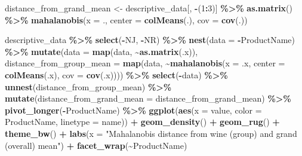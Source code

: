 \documentclass[
]{book}
\newenvironment{Shaded}{\begin{snugshade}}{\end{snugshade}}
\newcommand{\AttributeTok}[1]{\textcolor[rgb]{0.13,0.29,0.53}{#1}}
\newcommand{\DecValTok}[1]{\textcolor[rgb]{0.00,0.00,0.81}{#1}}
\newcommand{\FunctionTok}[1]{\textcolor[rgb]{0.13,0.29,0.53}{\textbf{#1}}}
\newcommand{\NormalTok}[1]{#1}
\newcommand{\OtherTok}[1]{\textcolor[rgb]{0.56,0.35,0.01}{#1}}
\newcommand{\SpecialCharTok}[1]{\textcolor[rgb]{0.81,0.36,0.00}{\textbf{#1}}}
\newcommand{\StringTok}[1]{\textcolor[rgb]{0.31,0.60,0.02}{#1}}
\begin{document}
\begin{Shaded}
\begin{Highlighting}[]
\NormalTok{distance\_from\_grand\_mean }\OtherTok{\textless{}{-}} 
\NormalTok{  descriptive\_data[, }\SpecialCharTok{{-}}\NormalTok{(}\DecValTok{1}\SpecialCharTok{:}\DecValTok{3}\NormalTok{)] }\SpecialCharTok{\%\textgreater{}\%}
  \FunctionTok{as.matrix}\NormalTok{() }\SpecialCharTok{\%\textgreater{}\%}
  \FunctionTok{mahalanobis}\NormalTok{(}\AttributeTok{x =}\NormalTok{ ., }\AttributeTok{center =} \FunctionTok{colMeans}\NormalTok{(.), }\AttributeTok{cov =} \FunctionTok{cov}\NormalTok{(.))}

\NormalTok{descriptive\_data }\SpecialCharTok{\%\textgreater{}\%}
  \FunctionTok{select}\NormalTok{(}\SpecialCharTok{{-}}\NormalTok{NJ, }\SpecialCharTok{{-}}\NormalTok{NR) }\SpecialCharTok{\%\textgreater{}\%}
  \FunctionTok{nest}\NormalTok{(}\AttributeTok{data =} \SpecialCharTok{{-}}\NormalTok{ProductName) }\SpecialCharTok{\%\textgreater{}\%}
  \FunctionTok{mutate}\NormalTok{(}\AttributeTok{data =} \FunctionTok{map}\NormalTok{(data, }\SpecialCharTok{\textasciitilde{}}\FunctionTok{as.matrix}\NormalTok{(.x)), }
         \AttributeTok{distance\_from\_group\_mean =} \FunctionTok{map}\NormalTok{(data, }\SpecialCharTok{\textasciitilde{}}\FunctionTok{mahalanobis}\NormalTok{(}\AttributeTok{x =}\NormalTok{ .x, }\AttributeTok{center =} \FunctionTok{colMeans}\NormalTok{(.x), }\AttributeTok{cov =} \FunctionTok{cov}\NormalTok{(.x)))) }\SpecialCharTok{\%\textgreater{}\%}
  \FunctionTok{select}\NormalTok{(}\SpecialCharTok{{-}}\NormalTok{data) }\SpecialCharTok{\%\textgreater{}\%}
  \FunctionTok{unnest}\NormalTok{(distance\_from\_group\_mean) }\SpecialCharTok{\%\textgreater{}\%}
  \FunctionTok{mutate}\NormalTok{(}\AttributeTok{distance\_from\_grand\_mean =}\NormalTok{ distance\_from\_grand\_mean) }\SpecialCharTok{\%\textgreater{}\%}
  \FunctionTok{pivot\_longer}\NormalTok{(}\SpecialCharTok{{-}}\NormalTok{ProductName) }\SpecialCharTok{\%\textgreater{}\%}
  \FunctionTok{ggplot}\NormalTok{(}\FunctionTok{aes}\NormalTok{(}\AttributeTok{x =}\NormalTok{ value, }\AttributeTok{color =}\NormalTok{ ProductName, }\AttributeTok{linetype =}\NormalTok{ name)) }\SpecialCharTok{+}
  \FunctionTok{geom\_density}\NormalTok{() }\SpecialCharTok{+}
  \FunctionTok{geom\_rug}\NormalTok{() }\SpecialCharTok{+}
  \FunctionTok{theme\_bw}\NormalTok{() }\SpecialCharTok{+}
  \FunctionTok{labs}\NormalTok{(}\AttributeTok{x =} \StringTok{"Mahalanobis distance from wine (group) and grand (overall) mean"}\NormalTok{) }\SpecialCharTok{+}
  \FunctionTok{facet\_wrap}\NormalTok{(}\SpecialCharTok{\textasciitilde{}}\NormalTok{ProductName)}
\end{Highlighting}
\end{Shaded}
\end{document}
